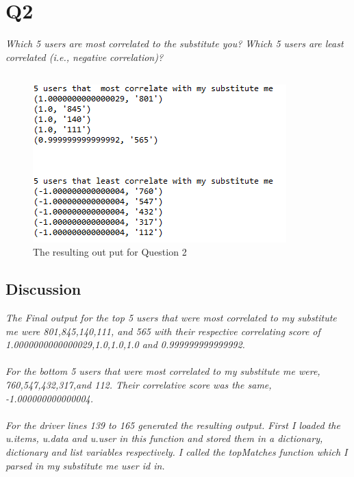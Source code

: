 \documentclass[12pt]{article}
\begin{document}
\section*{Q2}
\emph{Which 5 users are most correlated to the substitute you? Which 5 users are least correlated (i.e., negative correlation)?}
\subsection*{\color{blue}{Answer}}

\begin{figure}[H]
            \centering
            \includegraphics[trim=0 0 0 0, clip, width=\textwidth] {answer.PNG}
            \caption{ The resulting out put for Question 2}
            \label{fig:1}
\end{figure}
\subsection*{Discussion}
\emph{The Final output for the top 5 users that were most correlated to my substitute me were 801,845,140,111, and 565 with their respective correlating score of 1.0000000000000029,1.0,1.0,1.0 and 0.999999999999992. \\ \\ For the bottom 5 users that were most correlated to my substitute me were, 760,547,432,317,and 112. Their correlative score was the same, -1.000000000000004. \\ \\ For the driver lines 139 to 165 generated the resulting output. First I loaded the u.items, u.data and u.user in this function and stored them in a dictionary, dictionary and list variables respectively. I called the topMatches function which I parsed in my substitute me user id in.}
\end{document}
